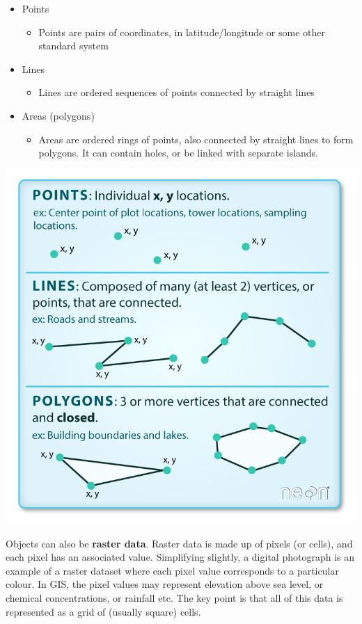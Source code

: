 \documentclass[
]{book}
\providecommand{\tightlist}{%
  \setlength{\itemsep}{0pt}\setlength{\parskip}{0pt}}
\begin{document}
\begin{itemize}
\tightlist
\item
  Points

  \begin{itemize}
  \tightlist
  \item
    Points are pairs of coordinates, in latitude/longitude or some other standard system
  \end{itemize}
\item
  Lines

  \begin{itemize}
  \tightlist
  \item
    Lines are ordered sequences of points connected by straight lines
  \end{itemize}
\item
  Areas (polygons)

  \begin{itemize}
  \tightlist
  \item
    Areas are ordered rings of points, also connected by straight lines to form polygons. It can contain holes, or be linked with separate islands.
  \end{itemize}
\end{itemize}

\includegraphics{img/ptlinepoly.png}

Objects can also be \textbf{raster data}. Raster data is made up of pixels (or cells), and each pixel has an associated value. Simplifying slightly, a digital photograph is an example of a raster dataset where each pixel value corresponds to a particular colour. In GIS, the pixel values may represent elevation above sea level, or chemical concentrations, or rainfall etc. The key point is that all of this data is represented as a grid of (usually square) cells.
\end{document}
